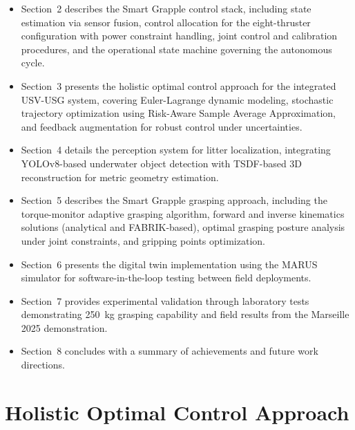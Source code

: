 \documentclass[a4paper,11pt]{article}
\let\oldsection\section
\renewcommand\section{\clearpage\oldsection}
\begin{document}
\begin{itemize}
    \item Section~2 describes the Smart Grapple control stack, including state estimation via sensor fusion, control allocation for the eight-thruster configuration with power constraint handling, joint control and calibration procedures, and the operational state machine governing the autonomous cycle.
    \item Section~3 presents the holistic optimal control approach for the integrated USV-USG system, covering Euler-Lagrange dynamic modeling, stochastic trajectory optimization using Risk-Aware Sample Average Approximation, and feedback augmentation for robust control under uncertainties.
    \item Section~4 details the perception system for litter localization, integrating YOLOv8-based underwater object detection with TSDF-based 3D reconstruction for metric geometry estimation.
    \item Section~5 describes the Smart Grapple grasping approach, including the torque-monitor adaptive grasping algorithm, forward and inverse kinematics solutions (analytical and FABRIK-based), optimal grasping posture analysis under joint constraints, and gripping points optimization.
    \item Section~6 presents the digital twin implementation using the MARUS simulator for software-in-the-loop testing between field deployments.
    \item Section~7 provides experimental validation through laboratory tests demonstrating 250~kg grasping capability and field results from the Marseille 2025 demonstration.
    \item Section~8 concludes with a summary of achievements and future work directions.
\end{itemize}




\section{Holistic Optimal Control Approach} \label{sec:HollisticOptCont}
\end{document}
